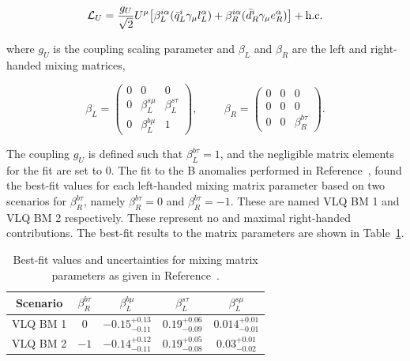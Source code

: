 \begin{equation}
\mathcal{L}_{U} = \frac{g_{U}}{\sqrt{2}} U^{\mu} \big[ \beta_{L}^{i\alpha}( \bar{q}_{L}^{i} \gamma_{\mu} l_{L}^{\alpha}) + \beta_{R}^{i\alpha}( \bar{d}_{R}^{i} \gamma_{\mu} e_{R}^{\alpha}) \big] + \text{h.c.}
\end{equation}

where $g_{U}$ is the coupling scaling parameter and $\beta_{L}$ and $\beta_{R}$ are the left and right-handed mixing matrices,

\begin{equation}
\beta_{L} = 
\begin{pmatrix}
0 & 0 & 0 \\
0 & \beta_{L}^{s\mu} & \beta_{L}^{s\tau} \\
0 & \beta_{L}^{b\mu} & 1
\end{pmatrix},
\hspace{1cm}
\beta_{R} = 
\begin{pmatrix}
0 & 0 & 0 \\
0 & 0 & 0 \\
0 & 0 & \beta_{R}^{b\tau}
\end{pmatrix}.
\end{equation}

The coupling $g_{U}$ is defined such that $\beta_{L}^{b\tau}=1$, and the negligible matrix elements for the fit are set to 0.
The fit to the B anomalies performed in Reference~\cite{Cornella:2021sby}, found the best-fit values for each left-handed mixing matrix parameter based on two scenarios for $\beta^{b\tau}_{R}$, namely $\beta^{b\tau}_{R} = 0$ and $\beta^{b\tau}_{R} = -1$.
These are named VLQ BM 1 and VLQ BM 2 respectively.
These represent no and maximal right-handed contributions. 
The best-fit results to the matrix parameters are shown in Table~\ref{tab:vlq_bestfit}.

\begin{table}[h]
\centering
\begin{tabular}{|c|c||c|c|c|}
\hline
Scenario & $\beta^{b\tau}_{R}$ & $\beta^{b\mu}_{L}$ & $\beta^{s\tau}_{L}$ & $\beta^{s\mu}_{L}$ \\
\hline
\hline
VLQ BM 1 & $0$ & $-0.15^{+0.13}_{-0.11}$ & $0.19^{+0.06}_{-0.09}$ & $0.014^{+0.01}_{-0.01}$ \\
VLQ BM 2 & $-1$ & $-0.14^{+0.12}_{-0.11}$ & $0.19^{+0.05}_{-0.08}$ & $0.03^{+0.01}_{-0.02}$ \\
\hline
\end{tabular}
\caption[Best-fit values for a vector leptoquark fit to the B anomalies.]{Best-fit values and uncertainties for mixing matrix parameters as given in Reference~\cite{Cornella:2021sby}.}
\label{tab:vlq_bestfit}
\end{table}

